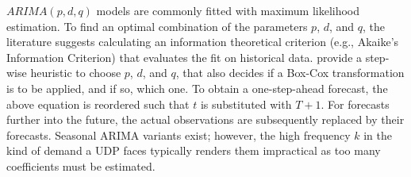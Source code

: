 $ARIMA(p,d,q)$ models are commonly fitted with maximum likelihood estimation.
To find an optimal combination of the parameters $p$, $d$, and $q$, the
    literature suggests calculating an information theoretical criterion
    (e.g., Akaike's Information Criterion) that evaluates the fit on
    historical data.
\cite{hyndman2008a} provide a step-wise heuristic to choose $p$, $d$, and $q$,
    that also decides if a Box-Cox transformation is to be applied, and if so,
    which one.
To obtain a one-step-ahead forecast, the above equation is reordered such
    that $t$ is substituted with $T+1$.
For forecasts further into the future, the actual observations are
    subsequently replaced by their forecasts.    
Seasonal ARIMA variants exist; however, the high frequency $k$ in the kind of
    demand a UDP faces typically renders them impractical as too many
    coefficients must be estimated.

